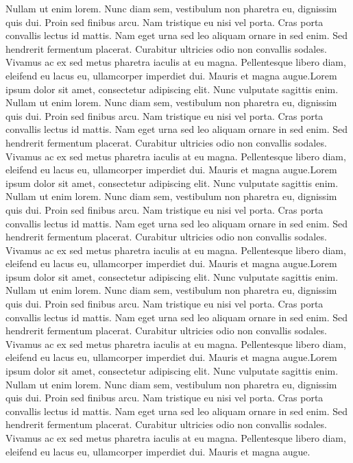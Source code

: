 \documentclass[twoside]{book}
\begin{document}
    \newpage
    Nullam ut enim lorem. Nunc diam sem, vestibulum non pharetra eu, dignissim quis dui. Proin sed finibus arcu. Nam tristique eu nisi vel porta. Cras porta convallis lectus id mattis. Nam eget urna sed leo aliquam ornare in sed enim. Sed hendrerit fermentum placerat. Curabitur ultricies odio non convallis sodales. Vivamus ac ex sed metus pharetra iaculis at eu magna. Pellentesque libero diam, eleifend eu lacus eu, ullamcorper imperdiet dui. Mauris et magna augue.Lorem ipsum dolor sit amet, consectetur adipiscing elit. Nunc vulputate sagittis enim. Nullam ut enim lorem. Nunc diam sem, vestibulum non pharetra eu, dignissim quis dui. Proin sed finibus arcu. Nam tristique eu nisi vel porta. Cras porta convallis lectus id mattis. Nam eget urna sed leo aliquam ornare in sed enim. Sed hendrerit fermentum placerat. Curabitur ultricies odio non convallis sodales. Vivamus ac ex sed metus pharetra iaculis at eu magna. Pellentesque libero diam, eleifend eu lacus eu, ullamcorper imperdiet dui. Mauris et magna augue.Lorem ipsum dolor sit amet, consectetur adipiscing elit. Nunc vulputate sagittis enim. Nullam ut enim lorem. Nunc diam sem, vestibulum non pharetra eu, dignissim quis dui. Proin sed finibus arcu. Nam tristique eu nisi vel porta. Cras porta convallis lectus id mattis. Nam eget urna sed leo aliquam ornare in sed enim. Sed hendrerit fermentum placerat. Curabitur ultricies odio non convallis sodales. Vivamus ac ex sed metus pharetra iaculis at eu magna. Pellentesque libero diam, eleifend eu lacus eu, ullamcorper imperdiet dui. Mauris et magna augue.Lorem ipsum dolor sit amet, consectetur adipiscing elit. Nunc vulputate sagittis enim. Nullam ut enim lorem. Nunc diam sem, vestibulum non pharetra eu, dignissim quis dui. Proin sed finibus arcu. Nam tristique eu nisi vel porta. Cras porta convallis lectus id mattis. Nam eget urna sed leo aliquam ornare in sed enim. Sed hendrerit fermentum placerat. Curabitur ultricies odio non convallis sodales. Vivamus ac ex sed metus pharetra iaculis at eu magna. Pellentesque libero diam, eleifend eu lacus eu, ullamcorper imperdiet dui. Mauris et magna augue.Lorem ipsum dolor sit amet, consectetur adipiscing elit. Nunc vulputate sagittis enim. Nullam ut enim lorem. Nunc diam sem, vestibulum non pharetra eu, dignissim quis dui. Proin sed finibus arcu. Nam tristique eu nisi vel porta. Cras porta convallis lectus id mattis. Nam eget urna sed leo aliquam ornare in sed enim. Sed hendrerit fermentum placerat. Curabitur ultricies odio non convallis sodales. Vivamus ac ex sed metus pharetra iaculis at eu magna. Pellentesque libero diam, eleifend eu lacus eu, ullamcorper imperdiet dui. Mauris et magna augue.
\end{document}
